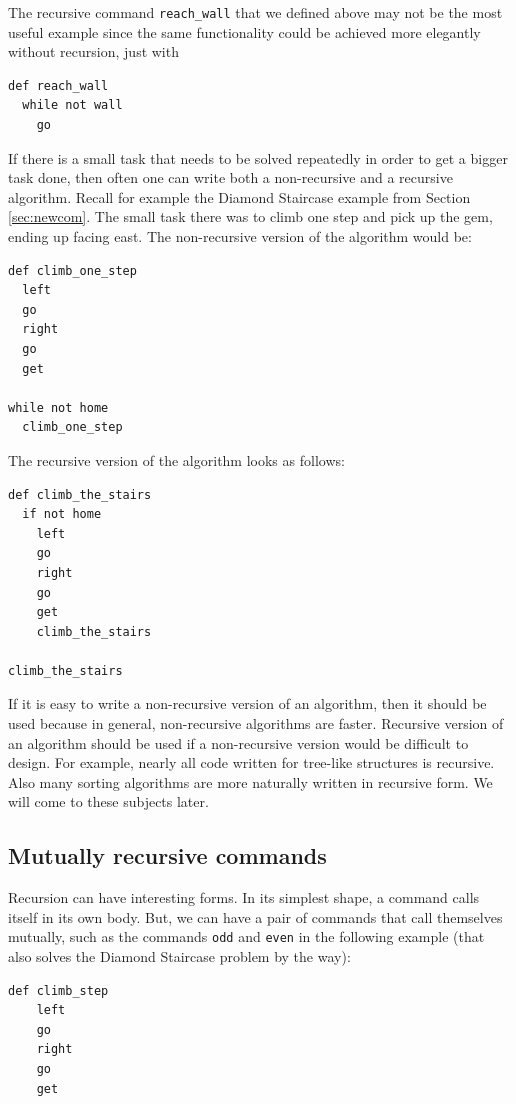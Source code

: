 \documentclass[article,A4,12pt]{llncs}
\begin{document}
{{{{The recursive command {\tt reach\_wall} that we defined above may not be the most useful example 
since the same functionality could be achieved more elegantly without recursion, just with

\begin{verbatim}
def reach_wall
  while not wall
    go
\end{verbatim}
If there is a small task that needs to be solved repeatedly in order to get a bigger task done,
then often one can write both a non-recursive and a recursive algorithm. Recall for example the Diamond
Staircase example from Section \ref{sec:newcom}. The small task there was to climb one step and pick 
up the gem, ending up facing east. The non-recursive version of the algorithm would be:

\begin{verbatim}
def climb_one_step
  left
  go
  right
  go
  get

while not home
  climb_one_step
\end{verbatim}
The recursive version of the algorithm looks as follows:

\begin{verbatim}
def climb_the_stairs
  if not home
    left
    go
    right
    go
    get
    climb_the_stairs

climb_the_stairs
\end{verbatim}
If it is easy to write a non-recursive version of an algorithm, then it should be used
because in general, non-recursive algorithms are faster. 
Recursive version of an algorithm should be used if a non-recursive version would 
be difficult to design. For example, nearly all code written for tree-like structures 
is recursive. Also many sorting algorithms are more naturally written in recursive form.
We will come to these subjects later.

\subsection{Mutually recursive commands}

Recursion can have interesting forms. In its simplest shape, a command 
calls itself in its own body. But, we can have a pair of commands
that call themselves mutually, such as the commands {\tt odd} and 
{\tt even} in the following example (that also solves the Diamond Staircase
problem by the way):
 
\begin{verbatim}
def climb_step
    left
    go
    right
    go
    get 


\end{verbatim}}}}}
\end{document}
